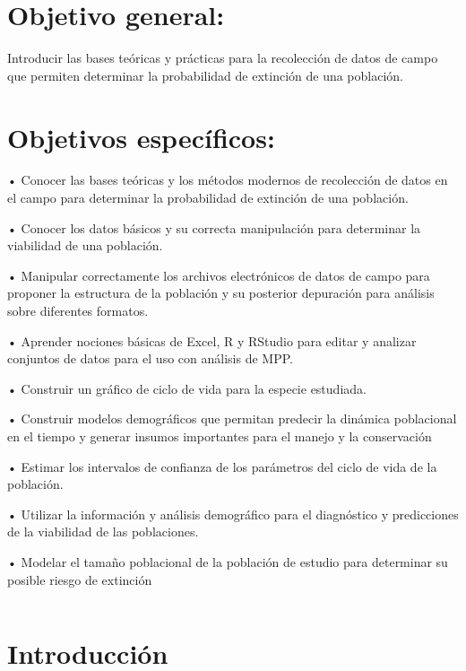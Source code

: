 \documentclass[
]{book}
\theoremstyle{definition}
\theoremstyle{definition}
\theoremstyle{definition}
\theoremstyle{definition}
\theoremstyle{remark}
\begin{document}
\hypertarget{objetivo-general}{%
\section{Objetivo general:}\label{objetivo-general}}

Introducir las bases teóricas y prácticas para la recolección de datos
de campo que permiten determinar la probabilidad de extinción de una
población.

\hypertarget{objetivos-especuxedficos}{%
\section{Objetivos específicos:}\label{objetivos-especuxedficos}}

• Conocer las bases teóricas y los métodos modernos de recolección de
datos en el campo para determinar la probabilidad de extinción de una
población.

\hfill\break
• Conocer los datos básicos y su correcta manipulación para determinar
la viabilidad de una población.

• Manipular correctamente los archivos electrónicos de datos de campo
para proponer la estructura de la población y su posterior depuración
para análisis sobre diferentes formatos.

• Aprender nociones básicas de Excel, R y RStudio para editar y analizar
conjuntos de datos para el uso con análisis de MPP.

• Construir un gráfico de ciclo de vida para la especie estudiada.

• Construir modelos demográficos que permitan predecir la dinámica
poblacional en el tiempo y generar insumos importantes para el manejo y
la conservación

• Estimar los intervalos de confianza de los parámetros del ciclo de
vida de la población.

• Utilizar la información y análisis demográfico para el diagnóstico y
predicciones de la viabilidad de las poblaciones.

• Modelar el tamaño poblacional de la población de estudio para
determinar su posible riesgo de extinción

\begin{verbatim}
\end{verbatim}

\hypertarget{introducciuxf3n-1}{%
\section{Introducción}\label{introducciuxf3n-1}}
\end{document}
